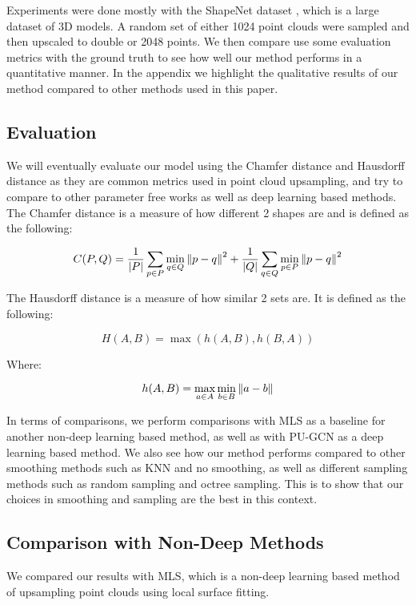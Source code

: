 Experiments were done mostly with the ShapeNet dataset \cite{shapenet}, which is a large dataset of 3D models. 
A random set of either 1024 point clouds were sampled and then upscaled to double or 2048 points.
We then compare use some evaluation metrics with the ground truth to see how well our method performs in a quantitative manner.
In the appendix we highlight the qualitative results of our method compared to other methods used in this paper.


\subsection{Evaluation}

We will eventually evaluate our model using the Chamfer distance and Hausdorff distance as they are common metrics used in point cloud upsampling, and try to compare to other parameter free works as well as deep learning based methods.
The Chamfer distance is a measure of how different 2 shapes are and is defined as the following:

$$ C(P, Q) = \dfrac{1}{|P|} \sum\limits_{p \in P} \min_{q \in Q} \left\lVert p - q\right\rVert^2 +  \dfrac{1}{|Q|} \sum\limits_{q \in Q} \min_{p \in P} \left\lVert p - q\right\rVert^2 \label{eq:chamfer}$$

The Hausdorff distance is a measure of how similar 2 sets are. It is defined as the following:

$$ H(A, B) = \max(h(A, B), h(B, A))\label{eq:hausdorff}$$

Where:

$$h(A, B) = \max_{a \in A} \min_{b \in B} \left\lVert a - b\right\rVert$$

In terms of comparisons, we perform comparisons with MLS as a baseline for another non-deep learning based method, as well as with PU-GCN as a deep learning based method.
We also see how our method performs compared to other smoothing methods such as KNN and no smoothing, as well as different sampling methods such as random sampling and octree sampling.
This is to show that our choices in smoothing and sampling are the best in this context.

\subsection{Comparison with Non-Deep Methods}

We compared our results with MLS, which is a non-deep learning based method of upsampling point clouds using local surface fitting.

